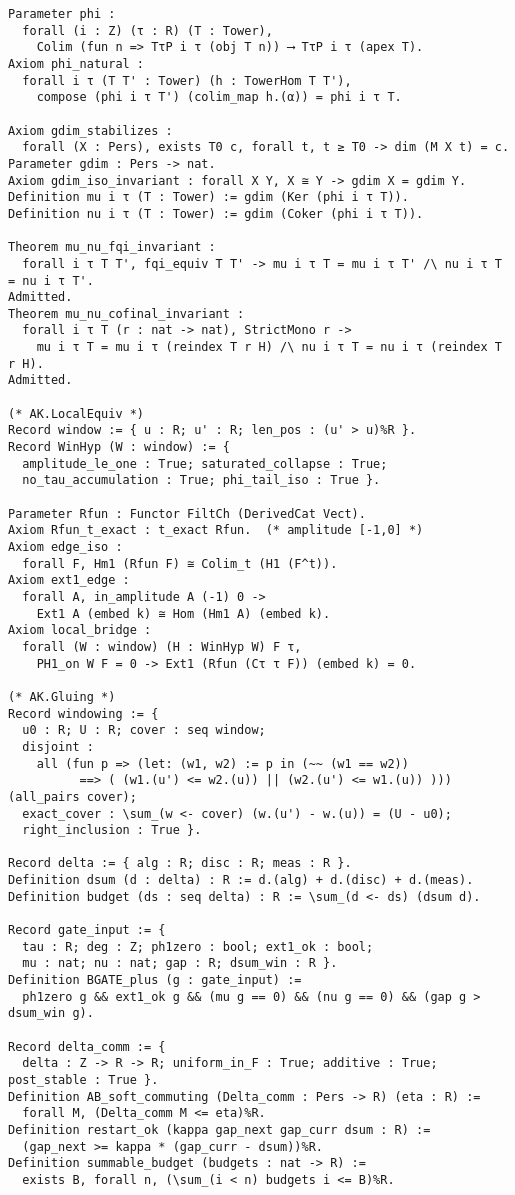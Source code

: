 \documentclass[11pt]{article}
\numberwithin{equation}{section}
\theoremstyle{plain}
\theoremstyle{definition}
\theoremstyle{remark}
\theoremstyle{plain}
\theoremstyle{definition}
\numberwithin{equation}{section}
\theoremstyle{definition}
\numberwithin{equation}{section}
\theoremstyle{plain}
\theoremstyle{definition}
\theoremstyle{remark}
\begin{document}
\begin{verbatim}
Parameter phi :
  forall (i : Z) (τ : R) (T : Tower),
    Colim (fun n => TτP i τ (obj T n)) ⟶ TτP i τ (apex T).
Axiom phi_natural :
  forall i τ (T T' : Tower) (h : TowerHom T T'),
    compose (phi i τ T') (colim_map h.(α)) = phi i τ T.

Axiom gdim_stabilizes :
  forall (X : Pers), exists T0 c, forall t, t ≥ T0 -> dim (M X t) = c.
Parameter gdim : Pers -> nat.
Axiom gdim_iso_invariant : forall X Y, X ≅ Y -> gdim X = gdim Y.
Definition mu i τ (T : Tower) := gdim (Ker (phi i τ T)).
Definition nu i τ (T : Tower) := gdim (Coker (phi i τ T)).

Theorem mu_nu_fqi_invariant :
  forall i τ T T', fqi_equiv T T' -> mu i τ T = mu i τ T' /\ nu i τ T = nu i τ T'.
Admitted.
Theorem mu_nu_cofinal_invariant :
  forall i τ T (r : nat -> nat), StrictMono r ->
    mu i τ T = mu i τ (reindex T r H) /\ nu i τ T = nu i τ (reindex T r H).
Admitted.

(* AK.LocalEquiv *)
Record window := { u : R; u' : R; len_pos : (u' > u)%R }.
Record WinHyp (W : window) := {
  amplitude_le_one : True; saturated_collapse : True;
  no_tau_accumulation : True; phi_tail_iso : True }.

Parameter Rfun : Functor FiltCh (DerivedCat Vect).
Axiom Rfun_t_exact : t_exact Rfun.  (* amplitude [-1,0] *)
Axiom edge_iso :
  forall F, Hm1 (Rfun F) ≅ Colim_t (H1 (F^t)).
Axiom ext1_edge :
  forall A, in_amplitude A (-1) 0 ->
    Ext1 A (embed k) ≅ Hom (Hm1 A) (embed k).
Axiom local_bridge :
  forall (W : window) (H : WinHyp W) F τ,
    PH1_on W F = 0 -> Ext1 (Rfun (Cτ τ F)) (embed k) = 0.

(* AK.Gluing *)
Record windowing := {
  u0 : R; U : R; cover : seq window;
  disjoint :
    all (fun p => (let: (w1, w2) := p in (~~ (w1 == w2))
          ==> ( (w1.(u') <= w2.(u)) || (w2.(u') <= w1.(u)) ))) (all_pairs cover);
  exact_cover : \sum_(w <- cover) (w.(u') - w.(u)) = (U - u0);
  right_inclusion : True }.

Record delta := { alg : R; disc : R; meas : R }.
Definition dsum (d : delta) : R := d.(alg) + d.(disc) + d.(meas).
Definition budget (ds : seq delta) : R := \sum_(d <- ds) (dsum d).

Record gate_input := {
  tau : R; deg : Z; ph1zero : bool; ext1_ok : bool;
  mu : nat; nu : nat; gap : R; dsum_win : R }.
Definition BGATE_plus (g : gate_input) :=
  ph1zero g && ext1_ok g && (mu g == 0) && (nu g == 0) && (gap g > dsum_win g).

Record delta_comm := {
  delta : Z -> R -> R; uniform_in_F : True; additive : True; post_stable : True }.
Definition AB_soft_commuting (Delta_comm : Pers -> R) (eta : R) :=
  forall M, (Delta_comm M <= eta)%R.
Definition restart_ok (kappa gap_next gap_curr dsum : R) :=
  (gap_next >= kappa * (gap_curr - dsum))%R.
Definition summable_budget (budgets : nat -> R) :=
  exists B, forall n, (\sum_(i < n) budgets i <= B)%R.


\end{verbatim}
\end{document}
